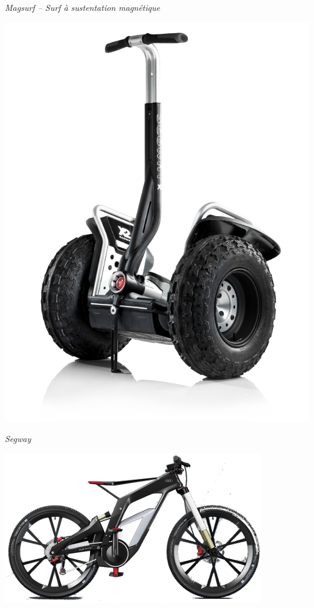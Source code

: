 \documentclass[11pt,oneside]{article}
\begin{document}
\begin{exemple}
\begin{minipage}[c]{.22\linewidth}
\begin{center}
\textit{Magsurf -- Surf à sustentation magnétique \cite{magsurf}}
\end{center}
\end{minipage} \hfill
\begin{minipage}[c]{.22\linewidth}
\begin{center}
\includegraphics[width=\textwidth]{png/segway}

\textit{Segway\cite{segway}}
\end{center}
\end{minipage}\hfill
\begin{minipage}[c]{.22\linewidth}
\begin{center}
\includegraphics[width=\textwidth]{png/velo_audi_p}


\end{center}
\end{minipage}
\end{exemple}
\end{document}
